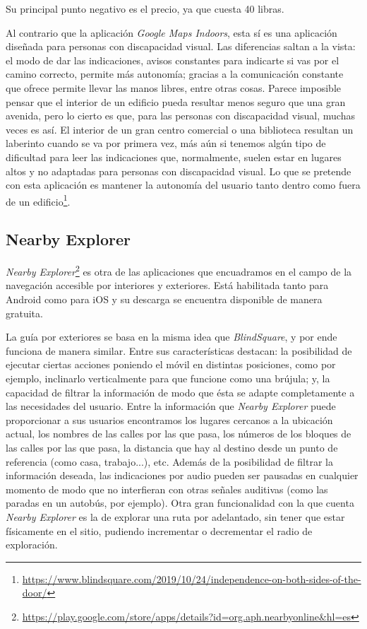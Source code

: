Su principal punto negativo es el precio, ya que cuesta 40 libras.

Al contrario que la aplicación \textit{Google Maps Indoors}, esta sí es una aplicación diseñada para personas con discapacidad visual. Las diferencias saltan a la vista: el modo de dar las indicaciones, avisos constantes para indicarte si vas por el camino correcto, permite más autonomía; gracias a la comunicación constante que ofrece permite llevar las manos libres, entre otras cosas. Parece imposible pensar que el interior de un edificio pueda resultar menos seguro que una gran avenida, pero lo cierto es que, para las personas con discapacidad visual, muchas veces es así. El interior de un gran centro comercial o una biblioteca resultan un laberinto cuando se va por primera vez, más aún si tenemos algún tipo de dificultad para leer las indicaciones que, normalmente, suelen estar en lugares altos y no adaptadas para personas con discapacidad visual. Lo que se pretende con esta aplicación es mantener la autonomía del usuario tanto dentro como fuera de un edificio\footnote{\url{https://www.blindsquare.com/2019/10/24/independence-on-both-sides-of-the-door/}}.



\subsection{Nearby Explorer}
\textit{Nearby Explorer}\footnote{\url{https://play.google.com/store/apps/details?id=org.aph.nearbyonline&hl=es}} es otra de las aplicaciones que encuadramos en el campo de la navegación accesible por interiores y exteriores. Está habilitada tanto para Android como para iOS y su descarga se encuentra disponible de manera gratuita. 

La guía por exteriores se basa en la misma idea que \textit{BlindSquare}, y por ende funciona de manera similar. Entre sus características destacan: la posibilidad de ejecutar ciertas acciones poniendo el móvil en distintas posiciones, como por ejemplo, inclinarlo verticalmente para que funcione como una brújula; y, la capacidad de filtrar la información de modo que ésta se adapte completamente a las necesidades del usuario. Entre la información que \textit{Nearby Explorer} puede proporcionar a sus usuarios encontramos los lugares cercanos a la ubicación actual, los nombres de las calles por las que pasa, los números de los bloques de las calles por las que pasa, la distancia que hay al destino desde un punto de referencia (como casa, trabajo...), etc. Además de la posibilidad de filtrar la información deseada, las indicaciones por audio pueden ser pausadas en cualquier momento de modo que no interfieran con otras señales auditivas (como las paradas en un autobús, por ejemplo). Otra gran funcionalidad con la que cuenta \textit{Nearby Explorer} es la de explorar una ruta por adelantado, sin tener que estar físicamente en el sitio, pudiendo incrementar o decrementar el radio de exploración.

